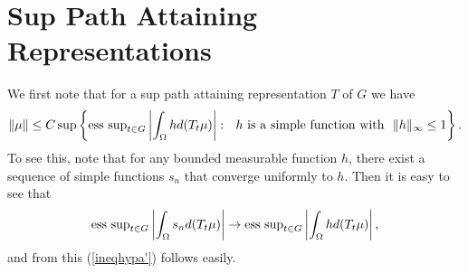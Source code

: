\documentclass[12pt]{article}
\renewcommand{\O}{\Omega}
\begin{document}
\section{Sup Path Attaining Representations}


We first note that for a sup path attaining representation $T$ of $G$ we
have
\begin{equation}
\| \mu\| \leq C\sup \left\{
{\rm ess\ sup}_{t\in G} \left|
\int_\O h d (T_t\mu)
\right|
:\ \ h {\rm \ is\ a\ simple\ function\ with\ }\ \|h\|_\infty\leq 1
\right\}.
\label{ineqhypa'}
\end{equation}
To see this, note that for any bounded measurable function $h$,
there exist a sequence of simple functions $s_n$ that converge uniformly
to $h$.  Then it is easy to see that
$$  {\rm ess\ sup}_{t\in G} \left|
\int_\O s_n d (T_t\mu)
\right|
\to
{\rm ess\ sup}_{t\in G} \left|
\int_\O h d (T_t\mu)
\right| ,$$
and from this (\ref{ineqhypa'}) follows easily.

\
\end{document}
